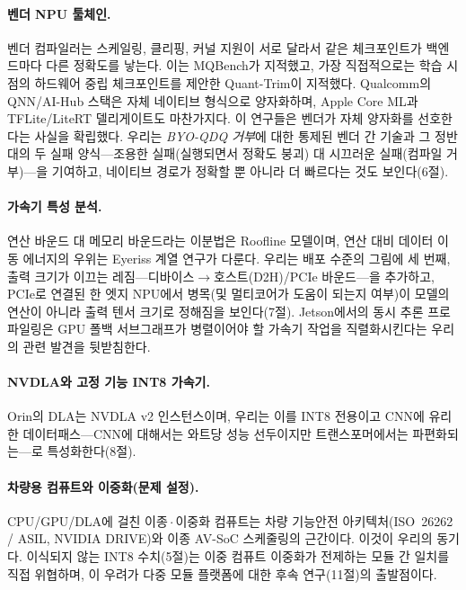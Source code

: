 \documentclass[11pt]{article}
\begin{document}
\paragraph{벤더 NPU 툴체인.}
벤더 컴파일러는 스케일링, 클리핑, 커널 지원이 서로 달라서 같은 체크포인트가 백엔드마다 다른 정확도를 낳는다. 이는 MQBench\citep{li2021mqbench}가 지적했고, 가장 직접적으로는 학습 시점의 하드웨어 중립 체크포인트를 제안한 Quant-Trim\citep{dhahri2025quanttrim}이 지적했다. Qualcomm의 QNN/AI-Hub 스택은 자체 네이티브 형식으로 양자화하며\citep{qualcomm_qnn}, Apple Core ML\citep{coreml}과 TFLite/LiteRT 델리게이트\citep{litert}도 마찬가지다. 이 연구들은 벤더가 자체 양자화를 선호한다는 사실을 확립했다. 우리는 \emph{BYO-QDQ 거부}에 대한 통제된 벤더 간 기술과 그 정반대의 두 실패 양식---조용한 실패(실행되면서 정확도 붕괴) 대 시끄러운 실패(컴파일 거부)---을 기여하고, 네이티브 경로가 정확할 뿐 아니라 더 빠르다는 것도 보인다(6절).

\paragraph{가속기 특성 분석.}
연산 바운드 대 메모리 바운드라는 이분법은 Roofline 모델\citep{williams2009roofline}이며, 연산 대비 데이터 이동 에너지의 우위는 Eyeriss 계열 연구\citep{chen2016eyeriss, sze2017efficient}가 다룬다. 우리는 배포 수준의 그림에 세 번째, 출력 크기가 이끄는 레짐---디바이스$\rightarrow$호스트(D2H)/PCIe 바운드---을 추가하고, PCIe로 연결된 한 엣지 NPU에서 병목(및 멀티코어가 도움이 되는지 여부)이 모델의 연산이 아니라 출력 텐서 크기로 정해짐을 보인다(7절). Jetson에서의 동시 추론 프로파일링\citep{jetsonconcurrent2025}은 GPU 폴백 서브그래프가 병렬이어야 할 가속기 작업을 직렬화시킨다는 우리의 관련 발견을 뒷받침한다.

\paragraph{NVDLA와 고정 기능 INT8 가속기.}
Orin의 DLA는 NVDLA v2 인스턴스이며\citep{nvdla, farshchi2019nvdla}, 우리는 이를 INT8 전용이고 CNN에 유리한 데이터패스---CNN에 대해서는 와트당 성능 선두이지만 트랜스포머에서는 파편화되는---로 특성화한다(8절).

\paragraph{차량용 컴퓨트와 이중화(문제 설정).}
CPU/GPU/DLA에 걸친 이종\,$\cdot$\,이중화 컴퓨트는 차량 기능안전 아키텍처(ISO~26262 / ASIL\citep{iso26262}, NVIDIA DRIVE\citep{nvidiadrive})와 이종 AV-SoC 스케줄링\citep{hetsched2022}의 근간이다. 이것이 우리의 동기다. 이식되지 않는 INT8 수치(5절)는 이중 컴퓨트 이중화가 전제하는 모듈 간 일치를 직접 위협하며, 이 우려가 다중 모듈 플랫폼에 대한 후속 연구(11절)의 출발점이다.
\end{document}
